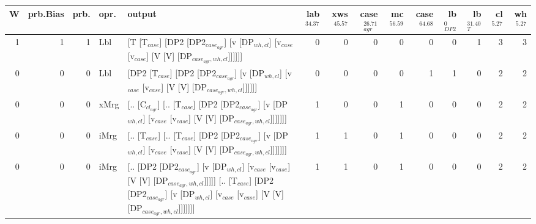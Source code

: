 \begin{tabularx}{\linewidth}{rrrlXrrrrrrrrr}
\hline
   W &   prb.Bias &   prb. & opr.   & output                                                                                                                                                                                 &   lab$^{34.37}$ &   xws$^{45.57}$ &   case$_{agr}^{26.71}$ &   mc$^{56.59}$ &   case$^{64.68}$ &   lb$_{DP2}^{0}$ &   lb$_{T}^{31.40}$ &   cl$^{5.27}$ &   wh$^{5.27}$ \\
\hline
   1 &       1 &   1 & Lbl  & [T [T$_{case}$] [DP2 [DP2$_{case_{agr}}$] [v [DP$_{wh,cl}$] [v$_{case}$ [v$_{case}$] [V [V] [DP$_{case_{agr},wh,cl}$]]]]]]                                                                                         &             0 &             0 &                  0 &            0 &              0 &            0 &              1 &        3 &        3 \\
   0 &       0 &   0 & Lbl  & [DP2 [T$_{case}$] [DP2 [DP2$_{case_{agr}}$] [v [DP$_{wh,cl}$] [v$_{case}$ [v$_{case}$] [V [V] [DP$_{case_{agr},wh,cl}$]]]]]]                                                                                       &             0 &             0 &                  0 &            0 &              1 &            1 &              0 &        2 &        2 \\
   0 &       0 &   0 & xMrg & [.. [C$_{cl_{agr}}$] [.. [T$_{case}$] [DP2 [DP2$_{case_{agr}}$] [v [DP$_{wh,cl}$] [v$_{case}$ [v$_{case}$] [V [V] [DP$_{case_{agr},wh,cl}$]]]]]]]                                                                        &             1 &             0 &                  0 &            1 &              0 &            0 &              0 &        2 &        2 \\
   0 &       0 &   0 & iMrg & [.. [T$_{case}$] [.. [T$_{case}$] [DP2 [DP2$_{case_{agr}}$] [v [DP$_{wh,cl}$] [v$_{case}$ [v$_{case}$] [V [V] [DP$_{case_{agr},wh,cl}$]]]]]]]                                                                          &             1 &             1 &                  0 &            1 &              0 &            0 &              0 &        2 &        2 \\
   0 &       0 &   0 & iMrg & [.. [DP2 [DP2$_{case_{agr}}$] [v [DP$_{wh,cl}$] [v$_{case}$ [v$_{case}$] [V [V] [DP$_{case_{agr},wh,cl}$]]]]] [.. [T$_{case}$] [DP2 [DP2$_{case_{agr}}$] [v [DP$_{wh,cl}$] [v$_{case}$ [v$_{case}$] [V [V] [DP$_{case_{agr},wh,cl}$]]]]]]] &             1 &             1 &                  0 &            1 &              0 &            0 &              0 &        2 &        2 \\

\end{tabularx}
